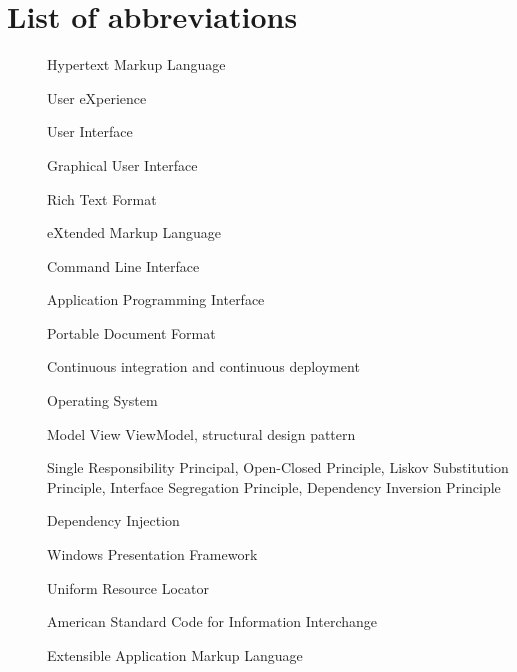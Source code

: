 \chapter*{List of abbreviations}

\begin{multicols}{2}
    \raggedright
    \begin{description}
        \item [] Hypertext Markup Language
        \item [] User eXperience
        \item [] User Interface
        \item [] Graphical User Interface
        \item [] Rich Text Format
        \item [] eXtended Markup Language
        \item [] Command Line Interface
        \item [] Application Programming Interface
        \item [] Portable Document Format
        \item [] Continuous integration and continuous deployment
        \item [] Operating System
        \item [] Model View ViewModel, structural design pattern \cite{katz_mvvm_2022}
        \item [] Single Responsibility Principal, Open-Closed Principle, Liskov Substitution Principle, Interface Segregation Principle, Dependency Inversion Principle \cite{hall_adaptive_2017}
        \item [] Dependency Injection \cite{deursen_dependency_2019}
        \item [] Windows Presentation Framework \cite{stilgar_state_2018}
        \item [] Uniform Resource Locator
        \item [] American Standard Code for Information Interchange \cite{randal_ascii_2015}
        \item [] Extensible Application Markup Language
    \end{description}
\end{multicols}

